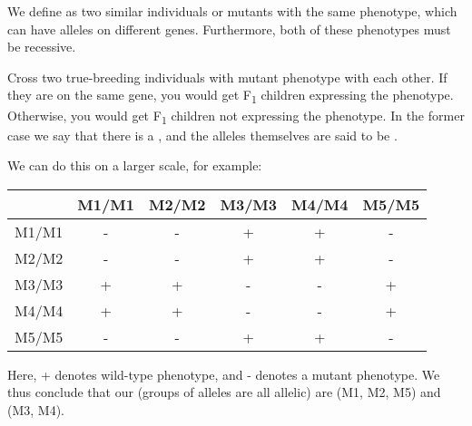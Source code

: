 \begin{defn}
	We define  as two similar individuals or mutants with the same phenotype, which can have alleles on different genes.
	Furthermore, both of these phenotypes must be recessive.
\end{defn}

\begin{exper}
	Cross two true-breeding individuals with mutant phenotype with each other. If they are on the same gene, you would get F\textsubscript1 children expressing the phenotype. Otherwise, you would get F\textsubscript1 children not expressing the phenotype.
	In the former case we say that there is a , and the alleles themselves are said to be .

	We can do this on a larger scale, for example:
	\begin{center}
		\begin{tabular}{c|c|c|c|c|c} 
			\x & M1/M1 & M2/M2 & M3/M3 & M4/M4 & M5/M5 \\ \hline
			M1/M1 & - & - & + & + & - \\ \hline
			M2/M2 & - & - & + & + & - \\ \hline
			M3/M3 & + & + & - & - & + \\ \hline
			M4/M4 & + & + & - & - & + \\ \hline
			M5/M5 & - & - & + & + & - 
		\end{tabular}	
	\end{center}
	Here, + denotes wild-type phenotype, and - denotes a mutant phenotype.
	We thus conclude that our  (groups of alleles are all allelic) are (M1, M2, M5) and (M3, M4).
\end{exper}


